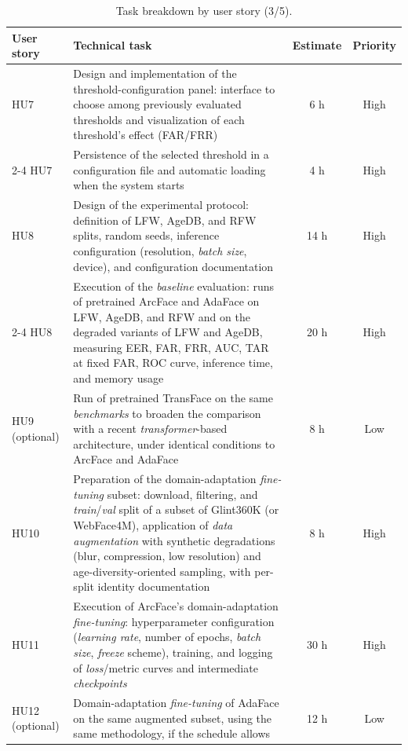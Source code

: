 \documentclass[
  11pt, %
]{charter}
\begin{document}
\begin{table}[htpb]
  \centering
  \small
  \renewcommand{\arraystretch}{0.9}
  \caption{Task breakdown by user story (3/5).}
  \begin{tabularx}{\linewidth}{@{}|X|X|c|c|@{}}
    \hline
    \rowcolor[HTML]{C0C0C0}
    User story & Technical task & Estimate & Priority \\ \hline

    HU7 & Design and implementation of the threshold-configuration panel: interface to choose among previously evaluated thresholds and visualization of each threshold's effect (FAR/FRR) & 6 h & High \\ \cline{2-4}
    HU7 & Persistence of the selected threshold in a configuration file and automatic loading when the system starts & 4 h & High \\ \hline

    HU8 & Design of the experimental protocol: definition of LFW, AgeDB, and RFW splits, random seeds, inference configuration (resolution, \textit{batch size}, device), and configuration documentation & 14 h & High \\ \cline{2-4}
    HU8 & Execution of the \textit{baseline} evaluation: runs of pretrained ArcFace and AdaFace on LFW, AgeDB, and RFW and on the degraded variants of LFW and AgeDB, measuring EER, FAR, FRR, AUC, TAR at fixed FAR, ROC curve, inference time, and memory usage & 20 h & High \\ \hline

    HU9 (optional) & Run of pretrained TransFace on the same \textit{benchmarks} to broaden the comparison with a recent \textit{transformer}-based architecture, under identical conditions to ArcFace and AdaFace & 8 h & Low \\ \hline

    HU10 & Preparation of the domain-adaptation \textit{fine-tuning} subset: download, filtering, and \textit{train}/\textit{val} split of a subset of Glint360K (or WebFace4M), application of \textit{data augmentation} with synthetic degradations (blur, compression, low resolution) and age-diversity-oriented sampling, with per-split identity documentation & 8 h & High \\ \hline

    HU11 & Execution of ArcFace's domain-adaptation \textit{fine-tuning}: hyperparameter configuration (\textit{learning rate}, number of epochs, \textit{batch size}, \textit{freeze} scheme), training, and logging of \textit{loss}/metric curves and intermediate \textit{checkpoints} & 30 h & High \\ \hline

    HU12 (optional) & Domain-adaptation \textit{fine-tuning} of AdaFace on the same augmented subset, using the same methodology, if the schedule allows & 12 h & Low \\ \hline

  \end{tabularx}
\end{table}
\end{document}
